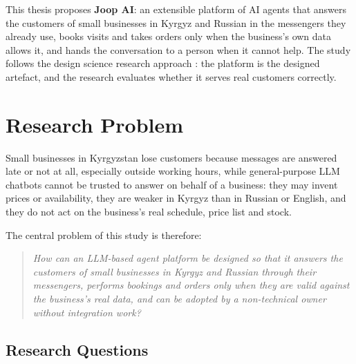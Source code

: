 This thesis proposes \textbf{Joop AI}: an extensible platform of AI agents that answers the customers of small
businesses in Kyrgyz and Russian in the messengers they already use, books visits and takes orders only when the
business's own data allows it, and hands the conversation to a person when it cannot help. The study follows the design
science research approach \parencite{hevner2004design, peffers2007design}: the platform is the designed artefact, and
the research evaluates whether it serves real customers correctly.


\section{Research Problem}

Small businesses in Kyrgyzstan lose customers because messages are answered late or not at all, especially outside
working hours, while general-purpose LLM chatbots cannot be trusted to answer on behalf of a business: they may invent
prices or availability, they are weaker in Kyrgyz than in Russian or English, and they do not act on the business's real
schedule, price list and stock.

The central problem of this study is therefore:

\begin{quote}
\textit{How can an LLM-based agent platform be designed so that it answers the customers of small businesses in Kyrgyz
and Russian through their messengers, performs bookings and orders only when they are valid against the business's real
data, and can be adopted by a non-technical owner without integration work?}
\end{quote}

\subsection{Research Questions}

